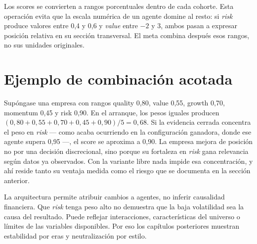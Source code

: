 Los scores se convierten a rangos porcentuales dentro de cada cohorte. Esta operación evita que la
escala numérica de un agente domine al resto: si \textit{risk} produce valores entre 0,4 y 0,6 y
\textit{value} entre $-2$ y $3$, ambos pasan a expresar posición relativa en su sección transversal.
El meta combina después esos rangos, no sus unidades originales.

\section{Ejemplo de combinación acotada}

Supóngase una empresa con rangos quality 0,80, value 0,55, growth 0,70, momentum 0,45 y risk 0,90.
En el arranque, los pesos iguales producen $(0,80+0,55+0,70+0,45+0,90)/5=0,68$. Si la evidencia
cerrada concentra el peso en \textit{risk} --- como acaba ocurriendo en la configuración ganadora,
donde ese agente supera 0,95 ---, el score se aproxima a 0,90. La empresa mejora de posición no por
una decisión discrecional, sino porque su fortaleza en \textit{risk} gana relevancia según datos ya
observados. Con la variante libre nada impide esa concentración, y ahí reside tanto su ventaja
medida como el riesgo que se documenta en la sección anterior.

La arquitectura permite atribuir cambios a agentes, no inferir causalidad financiera. Que
\textit{risk} tenga peso alto no demuestra que la baja volatilidad sea la causa del resultado. Puede
reflejar interacciones, características del universo o límites de las variables disponibles. Por eso
los capítulos posteriores muestran estabilidad por eras y neutralización por estilo.
